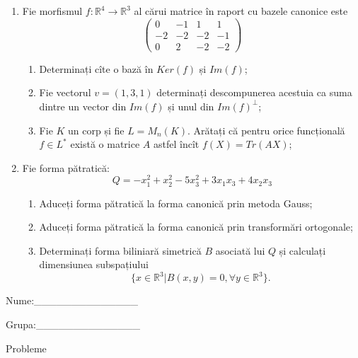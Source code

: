\documentclass{article}
\begin{document}
\begin{enumerate}
 \item Fie morfismul $f:\mathbb{R}^4 \to \mathbb{R}^3$ al cărui matrice în raport cu bazele canonice este
$$\begin{pmatrix}
0&-1&1&1\\
-2&-2&-2&-1\\
0&2&-2&-2
\end{pmatrix}$$

\begin{enumerate}
\item Determinați cîte o bază în $Ker(f)$ și $Im(f)$;
\item Fie vectorul $v=(1,3,1)$ determinați descompunerea acestuia ca suma dintre un vector din $Im(f)$ și unul din $Im(f)^\perp$;
\item Fie $K$ un corp și fie $L=M_n(K)$. Arătați că pentru orice funcțională $f \in L^*$ există o matrice $A$ astfel încît $f(X)=Tr(AX)$;
\end{enumerate}
\item Fie forma pătratică:
$$Q= -x_1^2+x_2^2-5x_3^2+3x_1x_3+4x_2x_3$$

\begin{enumerate}
\item Aduceți forma pătratică la forma canonică prin metoda Gauss;
\item Aduceți forma pătratică la forma canonică prin transformări ortogonale;
\item Determinați forma biliniară simetrică $B$ asociată lui $Q$ și calculați dimensiunea subspațiului
$$\{x \in \mathbb{R}^3 | B(x,y)=0,\forall y \in \mathbb{R}^3\}.$$

\end{enumerate}
\end{enumerate}
\newpage
\begin{flushright}
Nume:\_\_\_\_\_\_\_\_\_\_\_\_\_\_
 
 
Grupa:\_\_\_\_\_\_\_\_\_\_\_\_\_\_
\end{flushright}
\begin{center}
\vspace{2cm}
{\Large Probleme}
\vspace{2cm}
\end{center}
\end{document}

